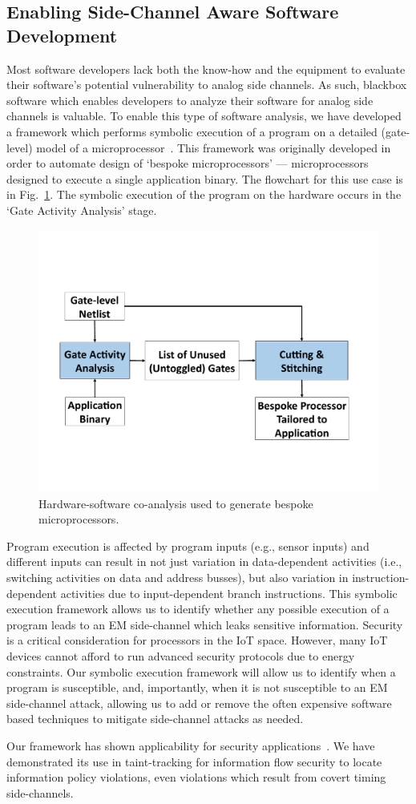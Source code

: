 \color{red}
\subsection{Enabling Side-Channel Aware Software Development}
Most software developers lack both the know-how and the equipment to evaluate
their software's potential vulnerability to analog side channels.  As such,
blackbox software which enables developers to analyze their software for analog
side channels is valuable. To enable this type of software analysis, we have
developed a framework which performs symbolic execution of a program on a
detailed (gate-level) model of a microprocessor~\cite{cherupalli2017}.
This framework was originally developed in order to automate design of
`bespoke microprocessors' --- microprocessors designed to execute a single
application binary. The flowchart for this use case is in Fig.~\ref{fig:bespoke}.
The symbolic execution of the program on the hardware occurs in the
`Gate Activity Analysis' stage.

\begin{figure}
\includegraphics[width=\linewidth]{./figure/Bespoke_Flow_Fig.pdf}
\caption{\small
    Hardware-software co-analysis used to generate bespoke microprocessors.}
\label{fig:bespoke}
\end{figure}

Program execution is affected by program inputs (e.g., sensor inputs) and
different inputs can result in not just variation in data-dependent activities
(i.e., switching activities on data and address busses), but also variation in
instruction-dependent activities due to input-dependent branch instructions.
This symbolic execution framework allows us to identify whether any possible
execution of a program leads to an EM side-channel which leaks sensitive
information. Security is a critical consideration for processors in the IoT
space.
However, many IoT devices cannot afford to run advanced security
protocols due to energy constraints. Our symbolic execution framework will
allow us to identify when a program is susceptible, and, importantly, when it
is not susceptible to an EM side-channel attack, allowing us to add or remove
the often expensive software based techniques to mitigate side-channel attacks
as needed.

Our framework has shown applicability for security
applications~\cite{cherupalli20172}. We have demonstrated its use in
taint-tracking for information flow security to locate information policy
violations, even violations which result from covert timing side-channels.

\color{black}
